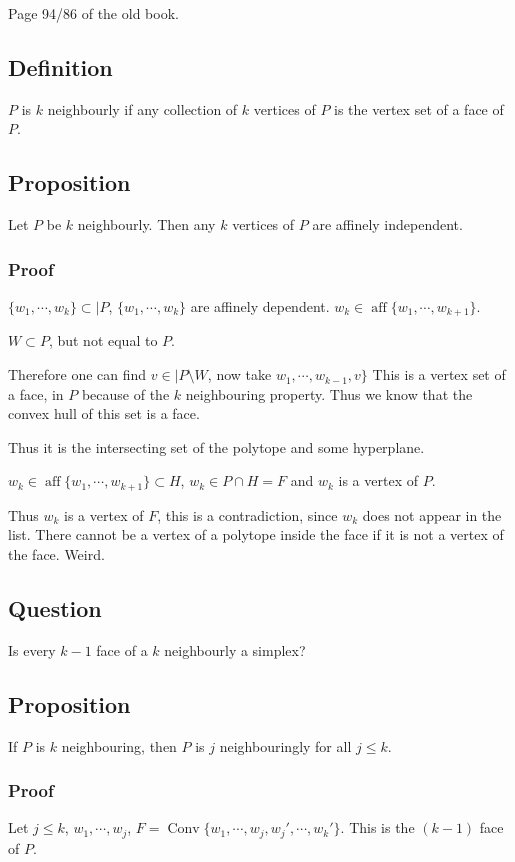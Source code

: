 \documentclass[11pt]{article}
\def\aff{\operatorname{aff}}
\def\conv{\operatorname{Conv}}
\begin{document}
{{Page 94/86 of the old book.
\subsection{Definition}
\label{sec:org0a19277}
\(P\) is \(k\) neighbourly if any collection of \(k\) vertices of \(P\) is the vertex
set of a face of \(P\).
\subsection{Proposition}
\label{sec:org392df5f}
Let \(P\) be \(k\) neighbourly. Then any \(k\) vertices of \(P\) are affinely
independent.
\subsubsection{Proof}
\label{sec:org77c89d8}
\(\{w_1, \cdots, w_k\} \subset \vert P\), \(\{w_1, \cdots, w_k\}\) are affinely
dependent. \(w_k \in \aff \{w_1, \cdots, w_{k+1}\}\).

\(W \subset P\), but not equal to \(P\).

Therefore one can find \(v \in \vert P \setminus W\), now take \(w_1, \cdots,
    w_{k - 1}, v\}\) This is a vertex set of a face, in \(P\) because of the \(k\)
neighbouring property. Thus we know that the convex hull of this set is a
face.

Thus it is the intersecting set of the polytope and some hyperplane.

\(w_k \in \aff\{w_1, \cdots, w_{k+1}\} \subset H\), \(w_k \in P \cap H = F\) and
\(w_k\) is a vertex of \(P\). 

Thus \(w_k\) is a vertex of \(F\), this is a contradiction, since \(w_k\) does not
appear in the list. There cannot be a vertex of a polytope inside the face
if it is not a vertex of the face. Weird.
\subsection{Question}
\label{sec:org19cc45b}
Is every \(k - 1\) face of a \(k\) neighbourly a simplex?
\subsection{Proposition}
\label{sec:org1995364}
If \(P\) is \(k\) neighbouring, then \(P\) is \(j\) neighbouringly for all \(j \le k\).
\subsubsection{Proof}
\label{sec:org5d1a9ad}
Let \(j \le k\), \(w_1, \cdots, w_j\), \(F =\conv\{w_1, \cdots, w_j, w_j',
    \cdots, w_k'\}\). This is the \((k - 1)\) face of \(P\).

}}
\end{document}
